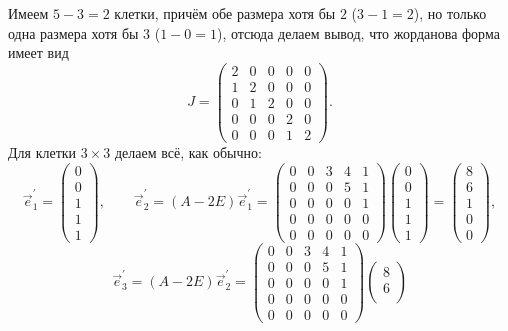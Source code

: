 \begin{solution}
	Имеем $5 - 3 = 2$ клетки, причём обе размера хотя бы $2$ ($3 - 1 = 2$), но только одна размера хотя бы $3$ ($1 - 0 = 1$), отсюда делаем вывод, что жорданова форма имеет вид
	\[
		J =
		\begin{pmatrix}
			2 & 0 & 0 & 0 & 0\\
			1 & 2 & 0 & 0 & 0\\
			0 & 1 & 2 & 0 & 0\\
			0 & 0 & 0 & 2 & 0\\
			0 & 0 & 0 & 1 & 2
		\end{pmatrix}.
	\]
	Для клетки $3 \times 3$ делаем всё, как обычно:
	\[
		\vec{e}^\prime_1 =
		\begin{pmatrix}
			0\\
			0\\
			1\\
			1\\
			1
		\end{pmatrix},\qquad
		\vec{e}^\prime_2 = (A - 2E)\vec{e}^\prime_1 =
		\begin{pmatrix}
			0 & 0 & 3 & 4 & 1\\
			0 & 0 & 0 & 5 & 1\\
			0 & 0 & 0 & 0 & 1\\
			0 & 0 & 0 & 0 & 0\\
			0 & 0 & 0 & 0 & 0
		\end{pmatrix}
		\begin{pmatrix}
			0\\
			0\\
			1\\
			1\\
			1
		\end{pmatrix} =
		\begin{pmatrix}
			8\\
			6\\
			1\\
			0\\
			0
		\end{pmatrix},
	\]
	\[
		\vec{e}^\prime_3 = (A - 2E)\vec{e}^\prime_2 =
		\begin{pmatrix}
			0 & 0 & 3 & 4 & 1\\
			0 & 0 & 0 & 5 & 1\\
			0 & 0 & 0 & 0 & 1\\
			0 & 0 & 0 & 0 & 0\\
			0 & 0 & 0 & 0 & 0
		\end{pmatrix}
		\begin{pmatrix}
			8\\
			6\\

\end{pmatrix}\]
\end{solution}
